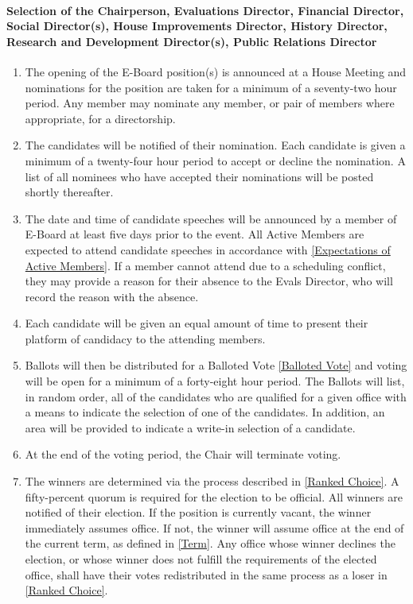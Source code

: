 \documentclass{article}
\newcommand{\asubsubsection}[1]{\paragraph{#1} \label{#1}}
\begin{document}
\asubsubsection{Selection of the Chairperson, Evaluations Director, Financial Director, Social Director(s), House Improvements Director, History Director,  Research and Development Director(s), Public Relations Director}
\begin{enumerate}
	\item The opening of the E-Board position(s) is announced at a House Meeting and nominations for the position are taken for a minimum of a seventy-two hour period.
	      Any member may nominate any member, or pair of members where appropriate, for a directorship.
	\item The candidates will be notified of their nomination.
	      Each candidate is given a minimum of a twenty-four hour period to accept or decline the nomination.
	      A list of all nominees who have accepted their nominations will be posted shortly thereafter.
	\item The date and time of candidate speeches will be announced by a member of E-Board at least five days prior to the event.
	      All Active Members are expected to attend candidate speeches in accordance with \ref{Expectations of Active Members}.
	      If a member cannot attend due to a scheduling conflict, they may provide a reason for their absence to the Evals Director, who will record the reason with the absence.
	\item Each candidate will be given an equal amount of time to present their platform of candidacy to the attending members.
	\item Ballots will then be distributed for a Balloted Vote \ref{Balloted Vote} and voting will be open for a minimum of a forty-eight hour period.
	      The Ballots will list, in random order, all of the candidates who are qualified for a given office with a means to indicate the selection of one of the candidates.
	      In addition, an area will be provided to indicate a write-in selection of a candidate.
	\item At the end of the voting period, the Chair will terminate voting.
	\item The winners are determined via the process described in \ref{Ranked Choice}.
	      A fifty-percent quorum is required for the election to be official.
	      All winners are notified of their election.
	      If the position is currently vacant, the winner immediately assumes office.
	      If not, the winner will assume office at the end of the current term, as defined in \ref{Term}.
	      Any office whose winner declines the election, or whose winner does not fulfill the requirements of the elected office, shall have their votes redistributed in the same process as a loser in \ref{Ranked Choice}.
\end{enumerate}
\end{document}
